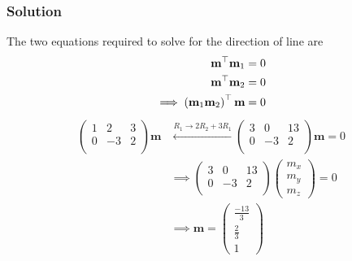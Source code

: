 \documentclass{beamer}
\begin{document}
\begin{frame}
\frametitle{Solution}
The two equations required to solve for the direction of line are 
\begin{align}
\textbf{m}^\top\textbf{m}_1 &= 0\\
\textbf{m}^\top\textbf{m}_2 &= 0\\
\implies \left(\textbf{m}_1\textbf{m}_2\right)^{\top}\textbf{m} &= 0
\end{align}
\begin{align}
    \begin{pmatrix}
        1 & 2 & 3\\
        0 & -3 & 2   \\
    \end{pmatrix}\textbf{m} &\xleftarrow{R_1 \to 2R_2 + 3R_1} \begin{pmatrix}
        3 & 0 & 13\\
        0 & -3 & 2   \\
    \end{pmatrix}\textbf{m} = 0\\
  &\implies  \begin{pmatrix}
        3 & 0 & 13\\
        0 & -3 & 2   \\
    \end{pmatrix}\begin{pmatrix}
        m_x\\
        m_y\\
        m_z
    \end{pmatrix} = 0\\
    &\implies \textbf{m} = \begin{pmatrix}
        \frac{-13}{3}\\
        \frac{2}{3}\\
        1
    \end{pmatrix}
\end{align}
\end{frame}
\end{document}
